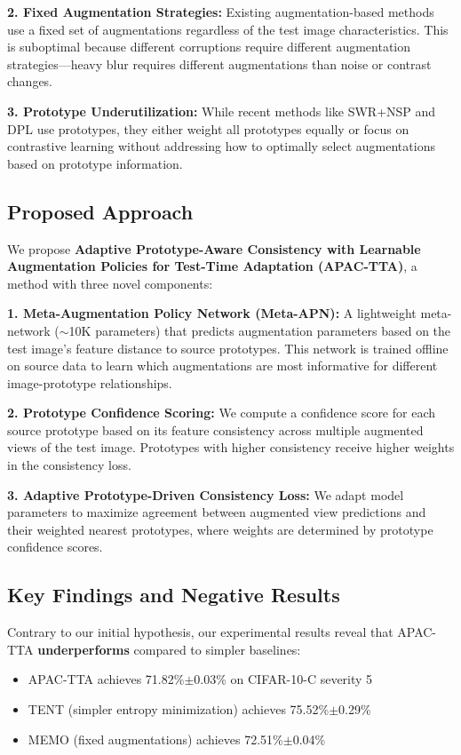\documentclass{article}
\begin{document}
\textbf{2. Fixed Augmentation Strategies:} Existing augmentation-based methods \citep{zhang2022memo, shu2022tpt} use a fixed set of augmentations regardless of the test image characteristics. This is suboptimal because different corruptions require different augmentation strategies---heavy blur requires different augmentations than noise or contrast changes.

\textbf{3. Prototype Underutilization:} While recent methods like SWR+NSP \citep{choi2022improving} and DPL \citep{wang2024decoupled} use prototypes, they either weight all prototypes equally or focus on contrastive learning without addressing how to optimally select augmentations based on prototype information.

\subsection{Proposed Approach}

We propose \textbf{Adaptive Prototype-Aware Consistency with Learnable Augmentation Policies for Test-Time Adaptation (APAC-TTA)}, a method with three novel components:

\textbf{1. Meta-Augmentation Policy Network (Meta-APN):} A lightweight meta-network ($\sim$10K parameters) that predicts augmentation parameters based on the test image's feature distance to source prototypes. This network is trained offline on source data to learn which augmentations are most informative for different image-prototype relationships.

\textbf{2. Prototype Confidence Scoring:} We compute a confidence score for each source prototype based on its feature consistency across multiple augmented views of the test image. Prototypes with higher consistency receive higher weights in the consistency loss.

\textbf{3. Adaptive Prototype-Driven Consistency Loss:} We adapt model parameters to maximize agreement between augmented view predictions and their weighted nearest prototypes, where weights are determined by prototype confidence scores.

\subsection{Key Findings and Negative Results}

Contrary to our initial hypothesis, our experimental results reveal that APAC-TTA \textbf{underperforms} compared to simpler baselines:
\begin{itemize}
    \item APAC-TTA achieves 71.82\%$\pm$0.03\% on CIFAR-10-C severity 5
    \item TENT (simpler entropy minimization) achieves 75.52\%$\pm$0.29\%
    \item MEMO (fixed augmentations) achieves 72.51\%$\pm$0.04\%
\end{itemize}
\end{document}
